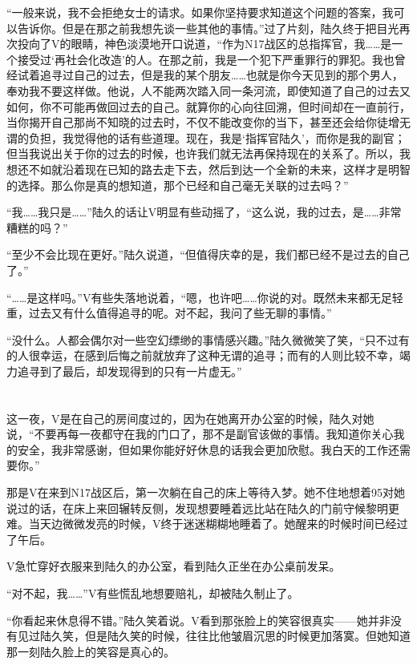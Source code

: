 “一般来说，我不会拒绝女士的请求。如果你坚持要求知道这个问题的答案，我可以告诉你。但是在那之前我想先谈一些其他的事情。”过了片刻，陆久终于把目光再次投向了V的眼睛，神色淡漠地开口说道，“作为N17战区的总指挥官，我……是一个接受过‘再社会化改造’的人。在那之前，我是一个犯下严重罪行的罪犯。我也曾经试着追寻过自己的过去，但是我的某个朋友……也就是你今天见到的那个男人，奉劝我不要这样做。他说，人不能两次踏入同一条河流，即使知道了自己的过去又如何，你不可能再做回过去的自己。就算你的心向往回溯，但时间却在一直前行，当你揭开自己那尚不知晓的过去时，不仅不能改变你的当下，甚至还会给你徒增无谓的负担，我觉得他的话有些道理。现在，我是‘指挥官陆久’，而你是我的副官；但当我说出关于你的过去的时候，也许我们就无法再保持现在的关系了。所以，我想还不如就沿着现在已知的路去走下去，然后到达一个全新的未来，这样才是明智的选择。那么你是真的想知道，那个已经和自己毫无关联的过去吗？”

“我……我只是……”陆久的话让V明显有些动摇了，“这么说，我的过去，是……非常糟糕的吗？”

“至少不会比现在更好。”陆久说道，“但值得庆幸的是，我们都已经不是过去的自己了。”

“……是这样吗。”V有些失落地说着，“嗯，也许吧……你说的对。既然未来都无足轻重，过去又有什么值得追寻的呢。对不起，我问了些无聊的事情。”

“没什么。人都会偶尔对一些空幻缥缈的事情感兴趣。”陆久微微笑了笑，“只不过有的人很幸运，在感到后悔之前就放弃了这种无谓的追寻；而有的人则比较不幸，竭力追寻到了最后，却发现得到的只有一片虚无。”



\section*{}

这一夜，V是在自己的房间度过的，因为在她离开办公室的时候，陆久对她说，“不要再每一夜都守在我的门口了，那不是副官该做的事情。我知道你关心我的安全，我非常感谢，但如果你能好好休息的话我会更加欣慰。我白天的工作还需要你。”

那是V在来到N17战区后，第一次躺在自己的床上等待入梦。她不住地想着95对她说过的话，在床上来回辗转反侧，发现想要睡着远比站在陆久的门前守候黎明更难。当天边微微发亮的时候，V终于迷迷糊糊地睡着了。她醒来的时候时间已经过了午后。

V急忙穿好衣服来到陆久的办公室，看到陆久正坐在办公桌前发呆。

“对不起，我……”V有些慌乱地想要赔礼，却被陆久制止了。

“你看起来休息得不错。”陆久笑着说。V看到那张脸上的笑容很真实——她并非没有见过陆久笑，但是陆久笑的时候，往往比他皱眉沉思的时候更加落寞。但她知道那一刻陆久脸上的笑容是真心的。

